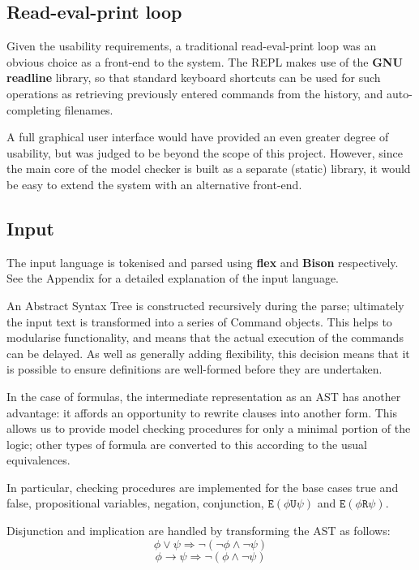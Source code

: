\documentclass[11pt]{article}
\theoremstyle{definition}
\begin{document}
\subsection{Read-eval-print loop}

Given the usability requirements, a traditional read-eval-print loop was an
obvious choice as a front-end to the system.  The REPL makes use of the
\textbf{GNU readline} library, so that standard keyboard shortcuts can be used
for such operations as retrieving previously entered commands from the history,
and auto-completing filenames. 

A full graphical user interface would have provided an even greater degree of
usability, but was judged to be beyond the scope of this project. However,
since the main core of the model checker is built as a separate (static)
library, it would be easy to extend the system with an alternative front-end.



\subsection{Input}
The input language is tokenised and parsed using \textbf{flex} and
\textbf{Bison} respectively. See the Appendix for a detailed explanation of the
input language.

An Abstract Syntax Tree is constructed recursively during the parse; ultimately
the input text is transformed into a series of Command objects. This helps to
modularise functionality, and means that the actual execution of the commands
can be delayed. As well as generally adding flexibility, this decision means
that it is possible to ensure definitions are well-formed before they are
undertaken.

In the case of formulas, the intermediate representation as an AST has another
advantage: it affords an opportunity to rewrite clauses into another form.
This allows us to provide model checking procedures for only a minimal portion
of the logic; other types of formula are converted to this according to the
usual equivalences.

In particular, checking procedures are implemented for the base cases true and
false, propositional variables, negation, conjunction,
$\texttt{E}(\phi\texttt{U}\psi)$ and $\texttt{E}(\phi\texttt{R}\psi)$.

Disjunction and implication are handled by transforming the AST as follows:
\[ \phi \vee \psi \Rightarrow \neg ( \neg \phi \wedge \neg \psi ) \]
\[ \phi \rightarrow \psi \Rightarrow \neg ( \phi \wedge \neg \psi ) \]
\end{document}
